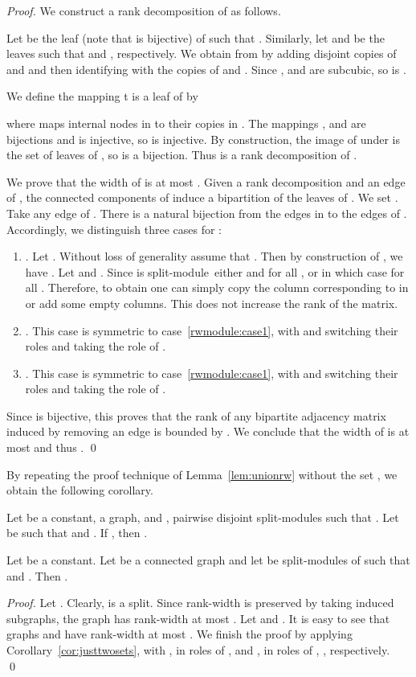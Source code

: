 \documentclass{llncs}
\def\sm{split-module}
\begin{document}
{\begin{proof}
 We construct a rank decomposition  of  as follows.  
 
 Let  be the leaf (note that  is
 bijective) of  such that . 
Similarly, let  and  be the leaves such that  and , respectively.  
 We obtain  from  by adding disjoint copies of
  and  and then identifying  with the copies of
  and . Since , and  are subcubic, so
 is .
 
 We define the mapping  t
 is a leaf of  by
  
  where  maps internal nodes in  to their copies in
  . The mappings , and  are
  bijections and  is injective, so  is injective. By
  construction, the image of  under  is the set of
  leaves of , so  is a bijection. Thus  is a rank decomposition of .

We prove that the width of  is at most . Given a rank
  decomposition  and an edge  of , the
  connected components of  induce a bipartition 
  of the leaves of . We set . Take any edge  of . There is a
  natural bijection  from the edges in  to the edges of . Accordingly, we distinguish three cases for :
 
  \begin{enumerate}
  \item . Let . Without loss of generality assume that .  Then by construction of  , we have . Let  and . Since  is \sm~either  and  for all , or  in which case  for all . Therefore, to obtain  one can simply copy the column corresponding to  in  or add some empty columns. This does not increase the rank of the matrix. \label{rwmodule:case1}
  \item . This case is symmetric to case~\ref{rwmodule:case1}, with
     and  switching their roles and   taking the role of .
  \item . This case is symmetric to case~\ref{rwmodule:case1}, with
     and  switching their roles and   taking the role of .
  \end{enumerate}
  Since  is bijective, this proves that the rank of any bipartite
  adjacency matrix induced by removing an edge  is bounded by . We
  conclude that the width of  is at most  and thus
  \mbox{}.
  \qed
\end{proof}

By repeating the proof technique of Lemma~\ref{lem:unionrw} without the set , we obtain the following corollary.
\begin{corollary}
\label{cor:justtwosets}
Let  be a constant,  a graph, and  ,  pairwise disjoint \sm s such that . Let  be such that  and . 
If , then .
\end{corollary}

\begin{lemma}\label{lem:smallrw}
 Let  be a constant. Let  be a connected graph and let 
  be \sm s of  such that  and . Then .
\end{lemma}

\begin{proof}
Let . Clearly,  is a split. Since rank-width is preserved by taking induced subgraphs, the graph  has rank-width at most . Let  and . It is easy to see that 
graphs   and  have rank-width at most
 . We finish the proof by applying Corollary~\ref{cor:justtwosets}, with , 
 in roles of ,  and ,  in roles of , , respectively.
 \qed
\end{proof}}
\end{document}
